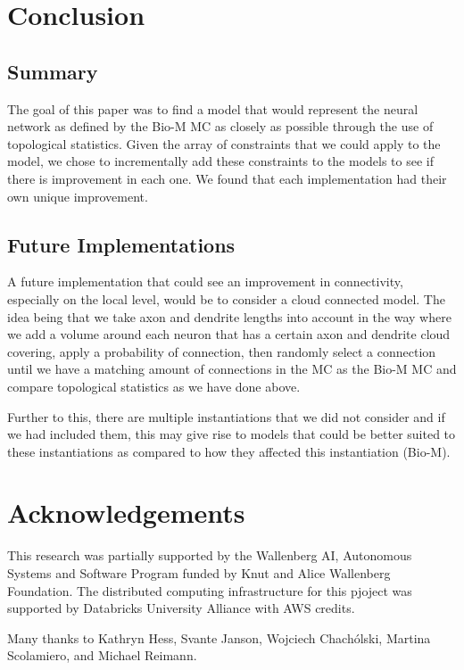 \section{Conclusion}
\subsection{Summary}
The goal of this paper was to find a model that would represent the neural network as defined by the Bio-M MC as closely as possible through the use of topological statistics. Given the array of constraints that we could apply to the model, we chose to incrementally add these constraints to the models to see if there is improvement in each one. We found that each implementation had their own unique improvement. 

\subsection{Future Implementations}
A future implementation that could see an improvement in connectivity, especially on the local level, would be to consider a cloud connected model. The idea being that we take axon and dendrite lengths into account in the way where we add a volume around each neuron that has a certain axon and dendrite cloud covering, apply a probability of connection, then randomly select a connection until we have a matching amount of connections in the MC as the Bio-M MC and compare topological statistics as we have done above.

Further to this, there are multiple instantiations that we did not consider and if we had included them, this may give rise to models that could be better suited to these instantiations as compared to how they affected this instantiation (Bio-M).

\section{Acknowledgements}

This research was partially supported by the Wallenberg AI, Autonomous Systems and Software Program funded by Knut and Alice Wallenberg Foundation. 
The distributed computing infrastructure for this pjoject was supported by Databricks University Alliance with AWS credits.

Many thanks to Kathryn Hess, Svante Janson, Wojciech Chachólski, Martina Scolamiero, and Michael Reimann.